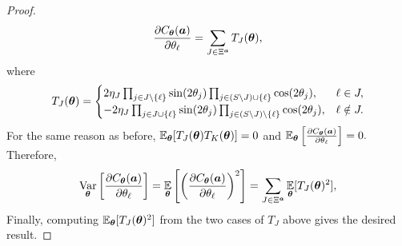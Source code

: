 \documentclass{article}
\theoremstyle{plain}
\theoremstyle{definition}
\theoremstyle{remark}
\begin{document}
\begin{proof}
\begin{equation*}
\frac{\partial C_{\bm{\theta}}({\bm{a}})}{\partial\theta_\ell}
=
\sum_{J\in\Xi^{\bm{a}}} T_J({\bm{\theta}}),
\end{equation*}
where
\begin{equation*}
T_J({\bm{\theta}})
=
\begin{cases}
2 \eta_J\prod_{j\in J\setminus\{\ell\}}\sin(2\theta_j)\prod_{j\in (S\setminus J) \cup \{\ell\}}\cos(2\theta_j), & \ell\in J,\\
-2 \eta_J \prod_{j\in J\cup \{\ell \}}\sin(2\theta_j)\prod_{j\in (S\setminus J)\setminus\{\ell\}}\cos(2\theta_j), & \ell\notin J.
\end{cases}
\label{eq:TJ_def}
\end{equation*}
For the same reason as before, $\operatorname*{\mathbb{E}}_{{\bm{\theta}}}[T_J({\bm{\theta}})T_K({\bm{\theta}})] = 0 $ and  $\operatorname*{\mathbb{E}}_{{\bm{\theta}}} \left[ \frac{\partial C_{\bm{\theta}}({\bm{a}})}{\partial\theta_\ell}\right] = 0.$
Therefore,
\begin{equation*}
\operatorname*{Var}_{{\bm{\theta}}}\left[\frac{\partial C_{\bm{\theta}}({\bm{a}})}{\partial\theta_\ell}\right]
=
\operatorname*{\mathbb{E}}_{{\bm{\theta}}}\left[\left(\frac{\partial C_{\bm{\theta}}({\bm{a}})}{\partial\theta_\ell}\right)^2\right]
=
\sum_{J\in \Xi^{\bm{a}}}\operatorname*{\mathbb{E}}_{{\bm{\theta}}}[T_J({\bm{\theta}})^2],
\label{eq:symmetric-derivative-variance}
\end{equation*}
Finally, computing $\operatorname*{\mathbb{E}}_{\bm{\theta}}[T_J({\bm{\theta}})^2]$ from the two cases of $T_J$ above gives the desired result.
\end{proof}
\end{document}
